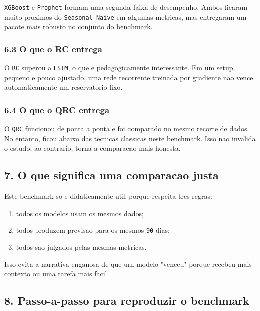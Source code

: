 \documentclass[12pt]{article}
\providecommand{\tightlist}{%
          \setlength{\itemsep}{0pt}\setlength{\parskip}{0pt}}
\begin{document}
\texttt{XGBoost} e \texttt{Prophet} formam uma segunda faixa de desempenho. Ambos ficaram muito proximos do \texttt{Seasonal\ Naive} em algumas metricas, mas entregaram um pacote mais robusto no conjunto do benchmark.

\subsubsection{6.3 O que o RC entrega}\label{63-o-que-o-rc-entrega}

O \texttt{RC} superou a \texttt{LSTM}, o que e pedagogicamente interessante. Em um setup pequeno e pouco ajustado, uma rede recorrente treinada por gradiente nao vence automaticamente um reservatorio fixo.

\subsubsection{6.4 O que o QRC entrega}\label{64-o-que-o-qrc-entrega}

O \texttt{QRC} funcionou de ponta a ponta e foi comparado no mesmo recorte de dados. No entanto, ficou abaixo das tecnicas classicas neste benchmark. Isso nao invalida o estudo; ao contrario, torna a comparacao mais honesta.

\subsection{7. O que significa uma comparacao justa}\label{7-o-que-significa-uma-comparacao-justa}

Este benchmark so e didaticamente util porque respeita tres regras:

\begin{enumerate}
\def\labelenumi{\arabic{enumi}.}
\tightlist
\item
  todos os modelos usam os mesmos dados;
\item
  todos produzem previsao para os mesmos \texttt{90} dias;
\item
  todos sao julgados pelas mesmas metricas.
\end{enumerate}

Isso evita a narrativa enganosa de que um modelo "venceu" porque recebeu mais contexto ou uma tarefa mais facil.

\subsection{8. Passo-a-passo para reproduzir o benchmark}\label{8-passo-a-passo-para-reproduzir-o-benchmark}
\end{document}
